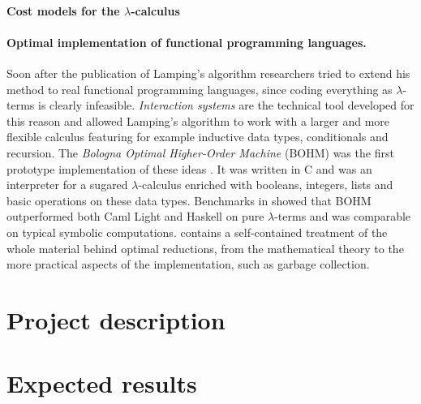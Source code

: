 \documentclass[english]{scrartcl}
\begin{document}
\paragraph{Cost models for the $\lambda$-calculus}
\paragraph{Optimal implementation of functional programming languages.}Soon after the publication of Lamping's algorithm researchers tried to extend his method to real functional programming languages, since coding everything as $\lambda$-terms is clearly infeasible. \emph{Interaction systems} \cite{asperti_interaction_1994, asperti_interaction_1996} are the technical tool developed for this reason and allowed Lamping's algorithm to work with a larger and more flexible calculus featuring for example inductive data types, conditionals and recursion. The \emph{Bologna Optimal Higher-Order Machine} (BOHM) was the first prototype implementation of these ideas \cite{asperti_bologna_1996}. It was written in C and was an interpreter for a sugared $\lambda$-calculus enriched with booleans, integers, lists and basic operations on these data types. Benchmarks in \cite{asperti_optimal_1998} showed that BOHM outperformed both Caml Light and Haskell on pure $\lambda$-terms and was comparable on typical symbolic computations. \cite{asperti_optimal_1998} contains a self-contained treatment of the whole material behind optimal reductions, from the mathematical theory to the more practical aspects of the implementation, such as garbage collection.
\section{Project description}
\section{Expected results}


\end{document}
